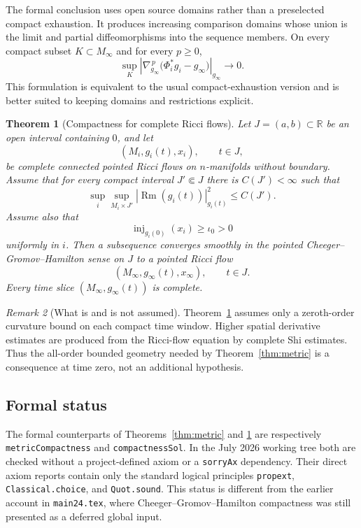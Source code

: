 \documentclass[11pt]{article}
\theoremstyle{plain}
\newtheorem{theorem}{Theorem}[section]
\theoremstyle{definition}
\theoremstyle{remark}
\newtheorem{remark}[theorem]{Remark}
\newcommand{\Rm}{\operatorname{Rm}}
\newcommand{\inj}{\operatorname{inj}}
\newcommand{\R}{\mathbb R}
\newcommand{\norm}[1]{\left|#1\right|}
\newcommand{\leanref}[1]{\nolinkurl{#1}}
\newcommand{\leanfile}[1]{\nolinkurl{#1}}
\begin{document}
The formal conclusion uses open source domains rather than a preselected
compact exhaustion.  It produces increasing comparison domains whose union
is the limit and partial diffeomorphisms into the sequence members.  On every
compact subset \(K\subset M_\infty\) and for every \(p\geq0\),
\[
  \sup_K
  \norm{\nabla_{g_\infty}^{\,p}
    \bigl(\Phi_i^*g_i-g_\infty\bigr)}_{g_\infty}
  \longrightarrow 0.
\]
This formulation is equivalent to the usual compact-exhaustion version and
is better suited to keeping domains and restrictions explicit.

\begin{theorem}[Compactness for complete Ricci flows]\label{thm:flow}
Let \(J=(a,b)\subset\R\) be an open interval containing \(0\), and let
\[
  (M_i,g_i(t),x_i),\qquad t\in J,
\]
be complete connected pointed Ricci flows on \(n\)-manifolds without
boundary.  Assume that for every compact interval \(J'\Subset J\) there is
\(C(J')<\infty\) such that
\[
  \sup_i\sup_{M_i\times J'}\norm{\Rm(g_i(t))}_{g_i(t)}^2
  \leq C(J').
\]
Assume also that
\[
  \inj_{g_i(0)}(x_i)\geq\iota_0>0
\]
uniformly in \(i\).  Then a subsequence converges smoothly in the pointed
Cheeger--Gromov--Hamilton sense on \(J\) to a pointed Ricci flow
\[
  (M_\infty,g_\infty(t),x_\infty),\qquad t\in J.
\]
Every time slice \((M_\infty,g_\infty(t))\) is complete.
\end{theorem}

\begin{remark}[What is and is not assumed]
Theorem~\ref{thm:flow} assumes only a zeroth-order curvature bound on each
compact time window.  Higher spatial derivative estimates are produced from
the Ricci-flow equation by complete Shi estimates.  Thus the all-order
bounded geometry needed by Theorem~\ref{thm:metric} is a consequence at
time zero, not an additional hypothesis.
\end{remark}

\subsection{Formal status}

The formal counterparts of Theorems~\ref{thm:metric} and
\ref{thm:flow} are respectively \leanref{metricCompactness} and
\leanref{compactnessSol}.
In the July 2026 working tree both are checked without a project-defined
axiom or a \leanref{sorryAx} dependency.  Their direct axiom reports contain
only the standard logical principles \leanref{propext},
\leanref{Classical.choice}, and \leanref{Quot.sound}.  This status is
different from the earlier account in \leanfile{main24.tex}, where
Cheeger--Gromov--Hamilton compactness was still presented as a deferred
global input.
\end{document}
